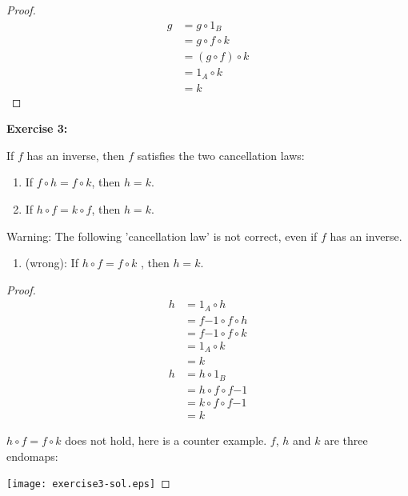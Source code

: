 \documentclass{book}
\begin{document}
\begin{proof}
  \begin{align*}
    g & = g \circ 1_{B} \\
      & = g \circ f \circ k \\
      & = (g \circ f) \circ k \\
      & = 1_{A} \circ k \\
      & = k
  \end{align*}
\end{proof}


\begin{flushleft}
\textbf{Exercise 3:}
\end{flushleft}
If $f$ has an inverse, then $f$ satisfies the two cancellation laws:
\begin{enumerate}[label=(\alph*)]
  \item If $f \circ h = f \circ k$, then $h = k$.
  \item If $h \circ f = k \circ f$, then $h = k$.
\end{enumerate}

Warning: The following 'cancellation law' is not correct, even if $f$ has an inverse.

\begin{enumerate}[label=(\alph*), start=3]
\item (wrong): If $h \circ f = f \circ k$ , then $h = k$.
\end{enumerate}

\begin{proof}
  \begin{align*}
    h & = 1_{A} \circ h \\
      & = f{-1} \circ f \circ h \\
      & = f{-1} \circ f \circ k \\
      & = 1_{A} \circ k \\
      & = k
  \end{align*}
  \begin{align*}
    h & = h \circ 1_{B}  \\
      & = h \circ f \circ f{-1}  \\
      & = k \circ f \circ f{-1} \\
      & = k
  \end{align*}

$h \circ f = f \circ k$ does not hold, here is a counter example. $f$, $h$ and
$k$ are three endomaps:

\texttt{[image: exercise3-sol.eps]}

\end{proof}
\end{document}
